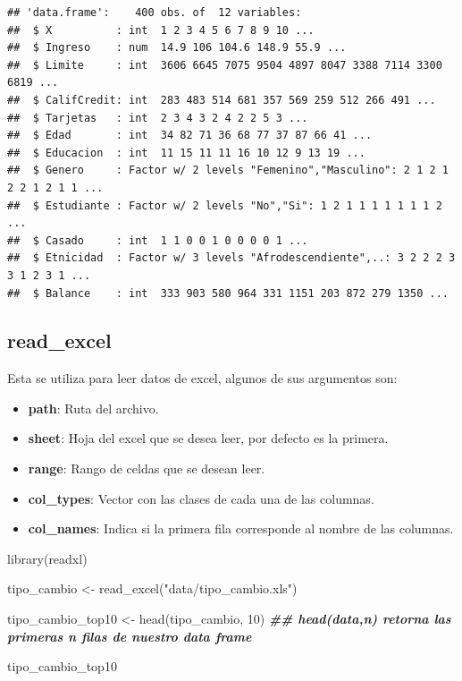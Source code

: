 \documentclass[
  12pt,
]{book}
\newenvironment{Shaded}{\begin{snugshade}}{\end{snugshade}}
\newcommand{\DecValTok}[1]{\textcolor[rgb]{0.00,0.00,0.81}{#1}}
\newcommand{\DocumentationTok}[1]{\textcolor[rgb]{0.56,0.35,0.01}{\textbf{\textit{#1}}}}
\newcommand{\FunctionTok}[1]{\textcolor[rgb]{0.00,0.00,0.00}{#1}}
\newcommand{\NormalTok}[1]{#1}
\newcommand{\OtherTok}[1]{\textcolor[rgb]{0.56,0.35,0.01}{#1}}
\newcommand{\StringTok}[1]{\textcolor[rgb]{0.31,0.60,0.02}{#1}}
\providecommand{\tightlist}{%
  \setlength{\itemsep}{0pt}\setlength{\parskip}{0pt}}
\begin{document}
\begin{verbatim}
## 'data.frame':    400 obs. of  12 variables:
##  $ X          : int  1 2 3 4 5 6 7 8 9 10 ...
##  $ Ingreso    : num  14.9 106 104.6 148.9 55.9 ...
##  $ Limite     : int  3606 6645 7075 9504 4897 8047 3388 7114 3300 6819 ...
##  $ CalifCredit: int  283 483 514 681 357 569 259 512 266 491 ...
##  $ Tarjetas   : int  2 3 4 3 2 4 2 2 5 3 ...
##  $ Edad       : int  34 82 71 36 68 77 37 87 66 41 ...
##  $ Educacion  : int  11 15 11 11 16 10 12 9 13 19 ...
##  $ Genero     : Factor w/ 2 levels "Femenino","Masculino": 2 1 2 1 2 2 1 2 1 1 ...
##  $ Estudiante : Factor w/ 2 levels "No","Si": 1 2 1 1 1 1 1 1 1 2 ...
##  $ Casado     : int  1 1 0 0 1 0 0 0 0 1 ...
##  $ Etnicidad  : Factor w/ 3 levels "Afrodescendiente",..: 3 2 2 2 3 3 1 2 3 1 ...
##  $ Balance    : int  333 903 580 964 331 1151 203 872 279 1350 ...
\end{verbatim}

\hypertarget{read_excel}{%
\subsection{\texorpdfstring{\textbf{read\_excel}}{read\_excel}}\label{read_excel}}

Esta se utiliza para leer datos de excel, algunos de sus argumentos son:

\begin{itemize}
\tightlist
\item
  \textbf{path}: Ruta del archivo.
\item
  \textbf{sheet}: Hoja del excel que se desea leer, por defecto es la primera.
\item
  \textbf{range}: Rango de celdas que se desean leer.
\item
  \textbf{col\_types}: Vector con las clases de cada una de las columnas.
\item
  \textbf{col\_names}: Indica si la primera fila corresponde al nombre de las columnas.
\end{itemize}

\begin{Shaded}
\begin{Highlighting}[]
\FunctionTok{library}\NormalTok{(readxl)}


\NormalTok{tipo\_cambio }\OtherTok{\textless{}{-}} \FunctionTok{read\_excel}\NormalTok{(}\StringTok{"data/tipo\_cambio.xls"}\NormalTok{)}

\NormalTok{tipo\_cambio\_top10 }\OtherTok{\textless{}{-}} \FunctionTok{head}\NormalTok{(tipo\_cambio, }\DecValTok{10}\NormalTok{) }\DocumentationTok{\#\# head(data,n) retorna las primeras n filas de nuestro data frame}

\NormalTok{tipo\_cambio\_top10}
\end{Highlighting}
\end{Shaded}
\end{document}
